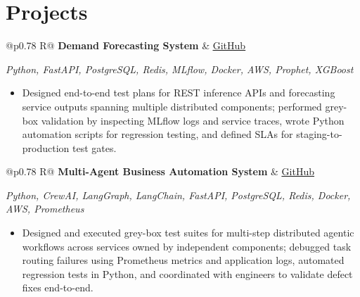 \documentclass[a4paper,10pt]{article}
\newcommand{\ulink}[2]{\href{#1}{\uline{#2}}}
\newcommand{\subheading}[1]{{\color[HTML]{0A0A0A}\fontsize{12}{14}\selectfont\bfseries #1}}
\newcommand{\techstack}[1]{{\color[HTML]{5C5C5C}\fontsize{10.5}{12.5}\selectfont\itshape #1}}
\newcommand{\meta}[1]{{\color[HTML]{5C5C5C}\fontsize{10.5}{12.5}\selectfont #1}}
\begin{document}
\vspace{2pt}

\section{Projects}
\vspace{2pt}

\begin{tabularx}{\linewidth}{@{}p{0.78\linewidth} R@{}}
\subheading{Demand Forecasting System} & \meta{\ulink{https://github.com/su-jin1425/Demand-Forecasting-System}{GitHub}}
\end{tabularx}
\vspace{1pt}
\techstack{Python, FastAPI, PostgreSQL, Redis, MLflow, Docker, AWS, Prophet, XGBoost}
\begin{itemize}[nosep, leftmargin=1.5em, itemsep=1pt, topsep=2pt]
\item {\color[HTML]{0A0A0A}\fontsize{11}{14}\selectfont
Designed end-to-end test plans for REST inference APIs and forecasting service outputs spanning multiple distributed components; performed grey-box validation by inspecting MLflow logs and service traces, wrote Python automation scripts for regression testing, and defined SLAs for staging-to-production test gates.}
\end{itemize}

\vspace{2pt}

\begin{tabularx}{\linewidth}{@{}p{0.78\linewidth} R@{}}
\subheading{Multi-Agent Business Automation System} & \meta{\ulink{https://github.com/su-jin1425/Multi-Agent-Business-Automation}{GitHub}}
\end{tabularx}
\vspace{1pt}
\techstack{Python, CrewAI, LangGraph, LangChain, FastAPI, PostgreSQL, Redis, Docker, AWS, Prometheus}
\begin{itemize}[nosep, leftmargin=1.5em, itemsep=1pt, topsep=2pt]
\item {\color[HTML]{0A0A0A}\fontsize{11}{14}\selectfont
Designed and executed grey-box test suites for multi-step distributed agentic workflows across services owned by independent components; debugged task routing failures using Prometheus metrics and application logs, automated regression tests in Python, and coordinated with engineers to validate defect fixes end-to-end.}
\end{itemize}

\vspace{2pt}
\end{document}
